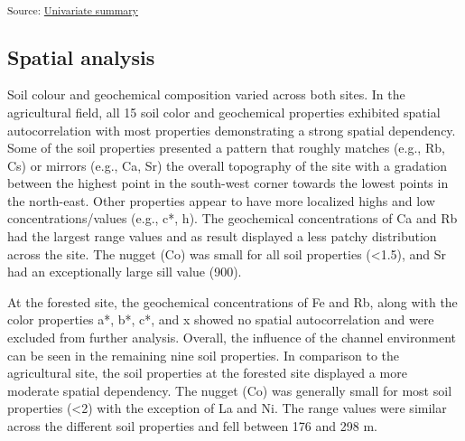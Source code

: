 \documentclass[
  number]{elsarticle}
\begin{document}
\textsubscript{Source:
\href{https://alex-koiter.github.io/spatial-variability-soil-manuscript/notebooks/univariate_summary.qmd.html\#cell-tbl-univariate2-summary}{Univariate
summary}}

\subsection{Spatial analysis}\label{spatial-analysis}

Soil colour and geochemical composition varied across both sites. In the
agricultural field, all 15 soil color and geochemical properties
exhibited spatial autocorrelation with most properties demonstrating a
strong spatial dependency. Some of the soil properties presented a
pattern that roughly matches (e.g., Rb, Cs) or mirrors (e.g., Ca, Sr)
the overall topography of the site with a gradation between the highest
point in the south-west corner towards the lowest points in the
north-east. Other properties appear to have more localized highs and low
concentrations/values (e.g., c*, h). The geochemical concentrations of
Ca and Rb had the largest range values and as result displayed a less
patchy distribution across the site. The nugget (Co) was small for all
soil properties (\textless1.5), and Sr had an exceptionally large sill
value (900).

At the forested site, the geochemical concentrations of Fe and Rb, along
with the color properties a*, b*, c*, and x showed no spatial
autocorrelation and were excluded from further analysis. Overall, the
influence of the channel environment can be seen in the remaining nine
soil properties. In comparison to the agricultural site, the soil
properties at the forested site displayed a more moderate spatial
dependency. The nugget (Co) was generally small for most soil properties
(\textless2) with the exception of La and Ni. The range values were
similar across the different soil properties and fell between 176 and
298 m.
\end{document}
